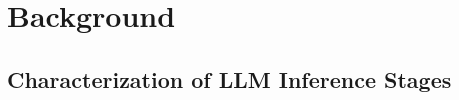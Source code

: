 \documentclass[conference]{IEEEtran}
\begin{document}


\section{Background}

\subsection{Characterization of LLM Inference Stages}
\label{ssec:llm-inference-stages}


\end{document}
